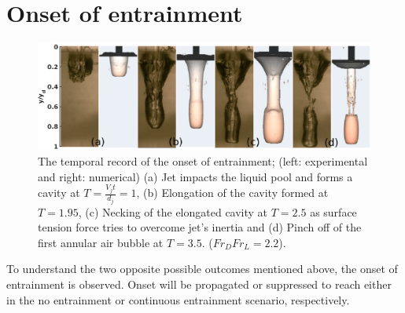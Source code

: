 \section{Onset of entrainment}
\begin{figure}
	\centering
	\includegraphics[width=\linewidth]{chapters/jetPool/Figure9}
	\caption{The temporal record of the onset of entrainment; (left: experimental and right: numerical) (a) Jet impacts the liquid pool and forms a cavity at $T = \frac{V_jt}{d_j} = 1$, (b) Elongation of the cavity formed at $T = 1.95$, (c) Necking of the elongated cavity at $T =2.5 $ as surface tension force tries to overcome jet's inertia and (d) Pinch off of the first annular air bubble at $T = 3.5$. ($Fr_DFr_L = 2.2$).}
	\label{Figure::pinchNum}
\end{figure}
To understand the two opposite possible outcomes mentioned above, the onset of entrainment is observed. Onset will be propagated or suppressed to reach either in the no entrainment or continuous entrainment scenario, respectively.
